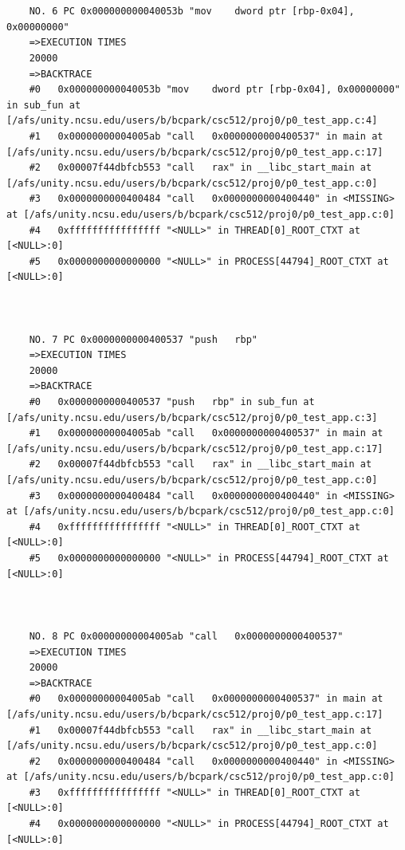 \documentclass[11pt]{article}
\begin{document}
\begin{verbatim}
    
    
    NO. 6 PC 0x000000000040053b "mov    dword ptr [rbp-0x04], 0x00000000"
    =>EXECUTION TIMES
    20000
    =>BACKTRACE
    #0   0x000000000040053b "mov    dword ptr [rbp-0x04], 0x00000000" in sub_fun at [/afs/unity.ncsu.edu/users/b/bcpark/csc512/proj0/p0_test_app.c:4]
    #1   0x00000000004005ab "call   0x0000000000400537" in main at [/afs/unity.ncsu.edu/users/b/bcpark/csc512/proj0/p0_test_app.c:17]
    #2   0x00007f44dbfcb553 "call   rax" in __libc_start_main at [/afs/unity.ncsu.edu/users/b/bcpark/csc512/proj0/p0_test_app.c:0]
    #3   0x0000000000400484 "call   0x0000000000400440" in <MISSING> at [/afs/unity.ncsu.edu/users/b/bcpark/csc512/proj0/p0_test_app.c:0]
    #4   0xffffffffffffffff "<NULL>" in THREAD[0]_ROOT_CTXT at [<NULL>:0]
    #5   0x0000000000000000 "<NULL>" in PROCESS[44794]_ROOT_CTXT at [<NULL>:0]
    
    
    
    NO. 7 PC 0x0000000000400537 "push   rbp"
    =>EXECUTION TIMES
    20000
    =>BACKTRACE
    #0   0x0000000000400537 "push   rbp" in sub_fun at [/afs/unity.ncsu.edu/users/b/bcpark/csc512/proj0/p0_test_app.c:3]
    #1   0x00000000004005ab "call   0x0000000000400537" in main at [/afs/unity.ncsu.edu/users/b/bcpark/csc512/proj0/p0_test_app.c:17]
    #2   0x00007f44dbfcb553 "call   rax" in __libc_start_main at [/afs/unity.ncsu.edu/users/b/bcpark/csc512/proj0/p0_test_app.c:0]
    #3   0x0000000000400484 "call   0x0000000000400440" in <MISSING> at [/afs/unity.ncsu.edu/users/b/bcpark/csc512/proj0/p0_test_app.c:0]
    #4   0xffffffffffffffff "<NULL>" in THREAD[0]_ROOT_CTXT at [<NULL>:0]
    #5   0x0000000000000000 "<NULL>" in PROCESS[44794]_ROOT_CTXT at [<NULL>:0]
    
    
    
    NO. 8 PC 0x00000000004005ab "call   0x0000000000400537"
    =>EXECUTION TIMES
    20000
    =>BACKTRACE
    #0   0x00000000004005ab "call   0x0000000000400537" in main at [/afs/unity.ncsu.edu/users/b/bcpark/csc512/proj0/p0_test_app.c:17]
    #1   0x00007f44dbfcb553 "call   rax" in __libc_start_main at [/afs/unity.ncsu.edu/users/b/bcpark/csc512/proj0/p0_test_app.c:0]
    #2   0x0000000000400484 "call   0x0000000000400440" in <MISSING> at [/afs/unity.ncsu.edu/users/b/bcpark/csc512/proj0/p0_test_app.c:0]
    #3   0xffffffffffffffff "<NULL>" in THREAD[0]_ROOT_CTXT at [<NULL>:0]
    #4   0x0000000000000000 "<NULL>" in PROCESS[44794]_ROOT_CTXT at [<NULL>:0]
    
    
    

\end{verbatim}
\end{document}
